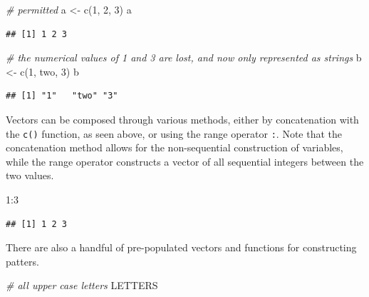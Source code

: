 \documentclass[
]{book}
\newenvironment{Shaded}{\begin{snugshade}}{\end{snugshade}}
\newcommand{\CommentTok}[1]{\textcolor[rgb]{0.56,0.35,0.01}{\textit{#1}}}
\newcommand{\DecValTok}[1]{\textcolor[rgb]{0.00,0.00,0.81}{#1}}
\newcommand{\FunctionTok}[1]{\textcolor[rgb]{0.00,0.00,0.00}{#1}}
\newcommand{\NormalTok}[1]{#1}
\newcommand{\OtherTok}[1]{\textcolor[rgb]{0.56,0.35,0.01}{#1}}
\newcommand{\SpecialCharTok}[1]{\textcolor[rgb]{0.00,0.00,0.00}{#1}}
\newcommand{\StringTok}[1]{\textcolor[rgb]{0.31,0.60,0.02}{#1}}
\begin{document}
\begin{Shaded}
\begin{Highlighting}[]
\CommentTok{\# permitted}
\NormalTok{a }\OtherTok{\textless{}{-}} \FunctionTok{c}\NormalTok{(}\DecValTok{1}\NormalTok{, }\DecValTok{2}\NormalTok{, }\DecValTok{3}\NormalTok{)}
\NormalTok{a}
\end{Highlighting}
\end{Shaded}

\begin{verbatim}
## [1] 1 2 3
\end{verbatim}

\begin{Shaded}
\begin{Highlighting}[]
\CommentTok{\# the numerical values of 1 and 3 are lost, and now only represented as strings}
\NormalTok{b }\OtherTok{\textless{}{-}} \FunctionTok{c}\NormalTok{(}\DecValTok{1}\NormalTok{, }\StringTok{\textquotesingle{}two\textquotesingle{}}\NormalTok{, }\DecValTok{3}\NormalTok{)}
\NormalTok{b}
\end{Highlighting}
\end{Shaded}

\begin{verbatim}
## [1] "1"   "two" "3"
\end{verbatim}

Vectors can be composed through various methods, either by concatenation with the \texttt{c()} function, as seen above, or using the range operator \texttt{:}. Note that the concatenation method allows for the non-sequential construction of variables, while the range operator constructs a vector of all sequential integers between the two values.

\begin{Shaded}
\begin{Highlighting}[]
\DecValTok{1}\SpecialCharTok{:}\DecValTok{3}
\end{Highlighting}
\end{Shaded}

\begin{verbatim}
## [1] 1 2 3
\end{verbatim}

There are also a handful of pre-populated vectors and functions for constructing patters.

\begin{Shaded}
\begin{Highlighting}[]
\CommentTok{\# all upper case letters}
\NormalTok{LETTERS}
\end{Highlighting}
\end{Shaded}
\end{document}
